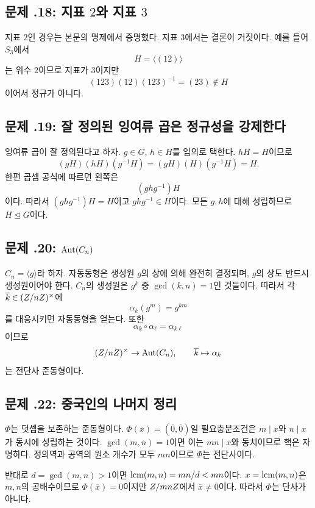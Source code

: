 \subsection*{문제 \thechapter.18: 지표 $2$와 지표 $3$}

\begin{solution}
지표 $2$인 경우는 본문의 명제에서 증명했다. 지표 $3$에서는 결론이 거짓이다. 예를 들어 $S_3$에서
\[
  H=\langle(12)\rangle
\]
는 위수 $2$이므로 지표가 $3$이지만
\[
  (123)(12)(123)^{-1}=(23)\notin H
\]
이어서 정규가 아니다.
\end{solution}

\subsection*{문제 \thechapter.19: 잘 정의된 잉여류 곱은 정규성을 강제한다}

\begin{solution}
잉여류 곱이 잘 정의된다고 하자. $g\in G$, $h\in H$를 임의로 택한다. $hH=H$이므로
\[
  (gH)(hH)(g^{-1}H)
  =(gH)(H)(g^{-1}H)
  =H.
\]
한편 곱셈 공식에 따르면 왼쪽은
\[
  (ghg^{-1})H
\]
이다. 따라서 $(ghg^{-1})H=H$이고 $ghg^{-1}\in H$이다. 모든 $g,h$에 대해 성립하므로 $H\trianglelefteq G$이다.
\end{solution}

\subsection*{문제 \thechapter.20: $\operatorname{Aut}(C_n)$}

\begin{solution}
$C_n=\langle g\rangle$라 하자. 자동동형은 생성원 $g$의 상에 의해 완전히 결정되며, $g$의 상도 반드시 생성원이어야 한다. $C_n$의 생성원은 $g^k$ 중 $\gcd(k,n)=1$인 것들이다. 따라서 각 $\overline k\in(Z/nZ)^\times$에
\[
  \alpha_k(g^m)=g^{km}
\]
를 대응시키면 자동동형을 얻는다. 또한
\[
  \alpha_k\circ\alpha_\ell=\alpha_{k\ell}
\]
이므로
\[
  (Z/nZ)^\times\to\operatorname{Aut}(C_n),
  \qquad \overline k\mapsto\alpha_k
\]
는 전단사 준동형이다.
\end{solution}

\subsection*{문제 \thechapter.22: 중국인의 나머지 정리}

\begin{solution}
$\Phi$는 덧셈을 보존하는 준동형이다. $\Phi(\overline x)=(\overline0,\overline0)$일 필요충분조건은 $m\mid x$와 $n\mid x$가 동시에 성립하는 것이다. $\gcd(m,n)=1$이면 이는 $mn\mid x$와 동치이므로 핵은 자명하다. 정의역과 공역의 원소 개수가 모두 $mn$이므로 $\Phi$는 전단사이다.

반대로 $d=\gcd(m,n)>1$이면 $\operatorname{lcm}(m,n)=mn/d<mn$이다. $x=\operatorname{lcm}(m,n)$은 $m,n$의 공배수이므로 $\Phi(\overline x)=0$이지만 $Z/mnZ$에서 $\overline x\ne\overline0$이다. 따라서 $\Phi$는 단사가 아니다.
\end{solution}

